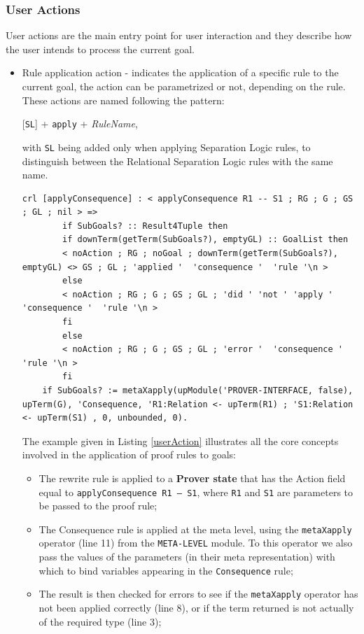 \documentclass[12pt,a4paper]{article}
\begin{document}
\subsubsection{User Actions}
User actions are the main entry point for user interaction and they describe how the user intends to process the current goal.
\begin{itemize}
	\item {Rule application action - indicates the application of a specific rule to the current goal, the action can be parametrized or not, depending on the rule. These actions are named following the pattern:	
	\begin{center}
		[\texttt{SL}] + \texttt{apply} + \textit{RuleName},
	\end{center}
		with \texttt{SL} being added only when applying Separation Logic rules, to distinguish between the Relational Separation Logic rules with the same name.
	}
		\begin{lstlisting}[label=userAction,caption=Rule Application Action]
	crl [applyConsequence] : < applyConsequence R1 -- S1 ; RG ; G ; GS ; GL ; nil > =>
		if SubGoals? :: Result4Tuple then 
		if downTerm(getTerm(SubGoals?), emptyGL) :: GoalList then
		< noAction ; RG ; noGoal ; downTerm(getTerm(SubGoals?), emptyGL) <> GS ; GL ; 'applied '  'consequence '  'rule '\n > 
		else
		< noAction ; RG ; G ; GS ; GL ; 'did ' 'not ' 'apply ' 'consequence '  'rule '\n > 
		fi
		else 
		< noAction ; RG ; G ; GS ; GL ; 'error '  'consequence '  'rule '\n > 
		fi 
	if SubGoals? := metaXapply(upModule('PROVER-INTERFACE, false), upTerm(G), 'Consequence, 'R1:Relation <- upTerm(R1) ; 'S1:Relation <- upTerm(S1) , 0, unbounded, 0).\end{lstlisting}
		The example given in Listing \ref{userAction} illustrates all the core concepts involved in the application of proof rules to goals: 
		\begin{itemize}
			\item The rewrite rule is applied to a \textbf{Prover state} that has the Action field equal to \texttt{applyConsequence R1 --- S1}, where \texttt{R1} and \texttt{S1} are parameters to be passed to the proof rule;
			\item The Consequence rule is applied at the meta level, using the \texttt{metaXapply} operator (line 11) from the \texttt{META-LEVEL} module. To this operator we also pass the values of the parameters (in their meta representation) with which to bind variables appearing in the \texttt{Consequence} rule;
			\item The result is then checked for errors to see if the \texttt{metaXapply} operator has not been applied correctly (line 8), or if the term returned is not actually of the required type (line 3);

\end{itemize}
\end{itemize}
\end{document}
